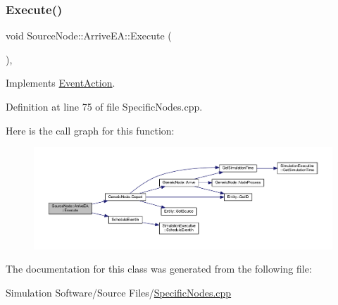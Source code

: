 \subsubsection{\texorpdfstring{Execute()}{Execute()}}
{\footnotesize\ttfamily void Source\+Node\+::\+Arrive\+E\+A\+::\+Execute (\begin{DoxyParamCaption}{ }\end{DoxyParamCaption})\hspace{0.3cm}{\ttfamily [inline]}, {\ttfamily [virtual]}}



Implements \hyperlink{class_event_action_a62b9d07abb4ca8e7c078b076a1ab1a9f}{Event\+Action}.



Definition at line 75 of file Specific\+Nodes.\+cpp.

Here is the call graph for this function\+:
\nopagebreak
\begin{figure}[H]
\begin{center}
\leavevmode
\includegraphics[width=350pt]{class_source_node_1_1_arrive_e_a_a622b2282aae023818b26d39519143c15_cgraph}
\end{center}
\end{figure}


The documentation for this class was generated from the following file\+:\begin{DoxyCompactItemize}
\item 
Simulation Software/\+Source Files/\hyperlink{_specific_nodes_8cpp}{Specific\+Nodes.\+cpp}\end{DoxyCompactItemize}
